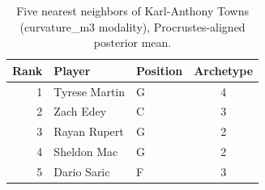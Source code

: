 \begin{table}[htbp]
  \centering\small
  \begin{tabular}{rllc}
    \toprule
    Rank & Player & Position & Archetype \\
    \midrule
    1 & Tyrese Martin & G & 4 \\
    2 & Zach Edey & C & 3 \\
    3 & Rayan Rupert & G & 2 \\
    4 & Sheldon Mac & G & 2 \\
    5 & Dario Saric & F & 3 \\
    \bottomrule
  \end{tabular}
  \caption{Five nearest neighbors of Karl-Anthony Towns (curvature_m3 modality), Procrustes-aligned posterior mean.}
  \label{tab:Karl_Anthony_Towns_neighbors_curvature_m3}
\end{table}

